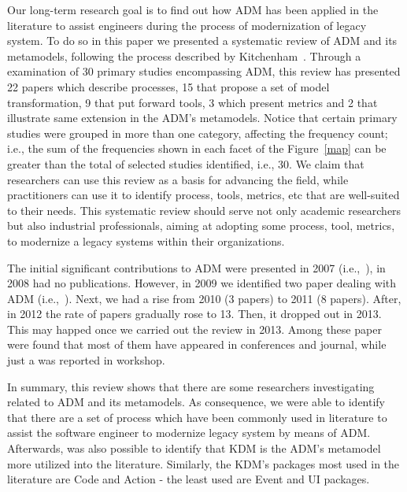 Our long-term research goal is to find out how ADM has been applied in the literature to assist engineers during the process of modernization of legacy system. To do so in this paper we presented a systematic review of ADM and its metamodels, following the process described by Kitchenham~\cite{Dyba}. Through a examination of 30 primary studies encompassing ADM, this review has presented 22 papers which describe processes, 15 that propose a set of model transformation, 9 that put forward tools, 3 which present metrics and 2 that illustrate same extension in the ADM's metamodels. Notice that certain primary studies were grouped in more than one category, affecting the frequency count; i.e., the sum of the frequencies shown in each facet of the Figure~\ref{map} can be greater than the total of selected studies identified, i.e., 30. We claim that researchers can use this review as a basis for advancing the field, while practitioners can use it to identify process, tools, metrics, etc that are well-suited to their needs. This systematic review should serve not only academic researchers but also industrial professionals, aiming at adopting some process, tool, metrics, to modernize a legacy systems within their organizations. %

The initial significant contributions to ADM were presented in 2007 (i.e.,~\cite{Mazon:2007:MDM:1784489.1784497, Guzman:2007:AAR:1339262.1339532, 4400179}), in 2008 had no publications. However, in 2009 we identified two paper dealing with ADM (i.e.,~\cite{delCastillo:2009:PRP:1529282.1529753, 5328801}). Next, we had a rise from 2010 (3 papers) to 2011 (8 papers). After, in 2012  
the rate of papers gradually rose to 13. Then, it dropped out in 2013. This may happed once we carried out the review in 2013. Among these paper were found that most of them have appeared in conferences and journal, while just a was reported in workshop.

In summary, this review shows that there are some researchers investigating related to ADM and its metamodels. As consequence, we were able to identify that there are a set of process which have been commonly used in literature to assist the software engineer to modernize legacy system by means of ADM. Afterwards, was also possible to identify that KDM is the ADM's metamodel more utilized into the literature. Similarly, the KDM's packages most used in the literature are Code and Action - the least used are Event and UI packages.

